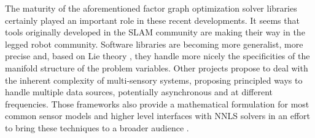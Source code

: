 The maturity of the aforementioned factor graph optimization solver libraries certainly played an important role in these recent developments. It seems
that tools originally developed in the SLAM community are making their way in the legged robot community. Software libraries are becoming more
generalist, more precise and, based on Lie theory \cite{sola2018micro}, they handle more nicely the specificities of the manifold structure of the problem variables.
Other projects propose to deal with the inherent complexity of multi-sensory systems, proposing principled ways to handle multiple data sources, potentially asynchronous and at
different frequencies. Those frameworks also provide a mathematical formulation for most common sensor models and higher level interfaces with NNLS solvers 
in an effort to bring these techniques to a broader audience \cite{sola2021wolf, blanco2019modular, colosi2020plug}.

